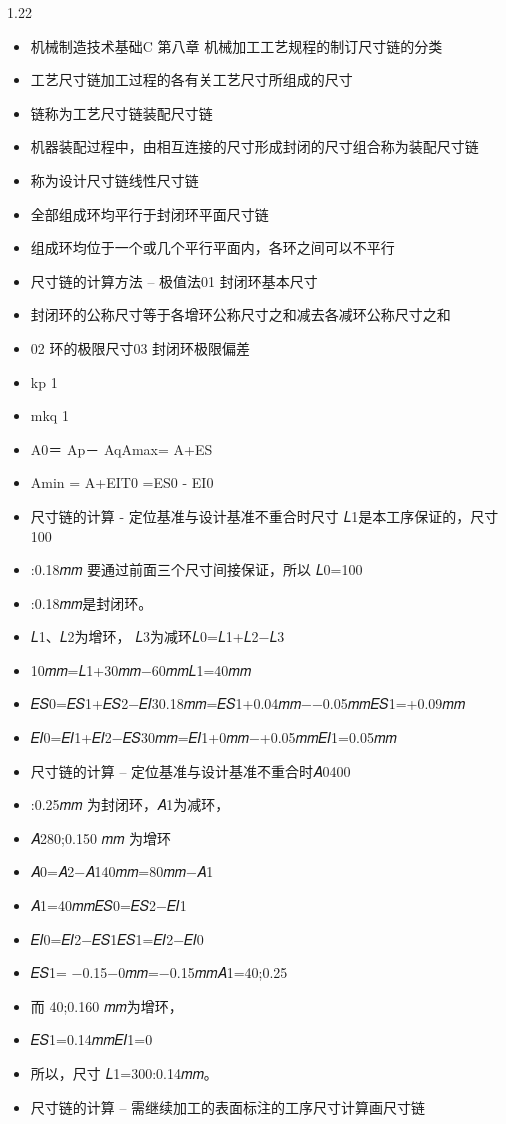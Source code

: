 \documentclass[12pt,a4paper]{article}
\begin{document}
\begin{spacing}{1.22}
\begin{itemize}[leftmargin=2.2em,label=--]
  \item 机械制造技术基础C 第八章 机械加工工艺规程的制订尺寸链的分类
  \item 工艺尺寸链加工过程的各有关工艺尺寸所组成的尺寸
  \item 链称为工艺尺寸链装配尺寸链
  \item 机器装配过程中，由相互连接的尺寸形成封闭的尺寸组合称为装配尺寸链
  \item 称为设计尺寸链线性尺寸链
  \item 全部组成环均平行于封闭环平面尺寸链
  \item 组成环均位于一个或几个平行平面内，各环之间可以不平行
  \item 尺寸链的计算方法 – 极值法01 封闭环基本尺寸
  \item 封闭环的公称尺寸等于各增环公称尺寸之和减去各减环公称尺寸之和
  \item 02 环的极限尺寸03 封闭环极限偏差
  \item kp 1
  \item mkq 1
  \item A0＝ Ap－ AqAmax= A+ES
  \item Amin = A+EIT0 =ES0 - EI0
  \item 尺寸链的计算 - 定位基准与设计基准不重合时尺寸 𝐿1是本工序保证的，尺寸 100
  \item :0.18𝑚𝑚 要通过前面三个尺寸间接保证，所以 𝐿0=100
  \item :0.18𝑚𝑚是封闭环。
  \item 𝐿1、𝐿2为增环， 𝐿3为减环𝐿0=𝐿1+𝐿2−𝐿3
  \item 10𝑚𝑚=𝐿1+30𝑚𝑚−60𝑚𝑚𝐿1=40𝑚𝑚
  \item 𝐸𝑆0=𝐸𝑆1+𝐸𝑆2−𝐸𝐼30.18𝑚𝑚=𝐸𝑆1+0.04𝑚𝑚−−0.05𝑚𝑚𝐸𝑆1=+0.09𝑚𝑚
  \item 𝐸𝐼0=𝐸𝐼1+𝐸𝐼2−𝐸𝑆30𝑚𝑚=𝐸𝐼1+0𝑚𝑚−+0.05𝑚𝑚𝐸𝐼1=0.05𝑚𝑚
  \item 尺寸链的计算 – 定位基准与设计基准不重合时𝐴0400
  \item :0.25𝑚𝑚 为封闭环，𝐴1为减环，
  \item 𝐴280;0.150 𝑚𝑚 为增环
  \item 𝐴0=𝐴2−𝐴140𝑚𝑚=80𝑚𝑚−𝐴1
  \item 𝐴1=40𝑚𝑚𝐸𝑆0=𝐸𝑆2−𝐸𝐼1
  \item 𝐸𝐼0=𝐸𝐼2−𝐸𝑆1𝐸𝑆1=𝐸𝐼2−𝐸𝐼0
  \item 𝐸𝑆1= −0.15−0𝑚𝑚=−0.15𝑚𝑚𝐴1=40;0.25
  \item 而 40;0.160 𝑚𝑚为增环，
  \item 𝐸𝑆1=0.14𝑚𝑚𝐸𝐼1=0
  \item 所以，尺寸 𝐿1=300:0.14𝑚𝑚。
  \item 尺寸链的计算 – 需继续加工的表面标注的工序尺寸计算画尺寸链

\end{itemize}
\end{spacing}
\end{document}
